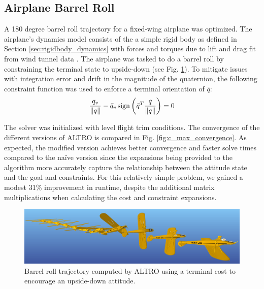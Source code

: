 \documentclass[letterpaper, 10 pt, conference]{ieeeconf}  %
\DeclareMathOperator{\sign}{sign}
\newcommand{\todo}[1]{\textcolor{red}{TODO: #1}}
\begin{document}
    \subsection{Airplane Barrel Roll}

        A 180 degree barrel roll trajectory for a fixed-wing airplane was
        optimized. The airplane's dynamics model consists of the a simple
        rigid body as defined in Section \ref{sec:rigidbody_dynamics} with
        forces and torques due to lift and drag fit from wind tunnel data
        \cite{manchester2016udp}. The airplane was tasked to do a barrel roll
        by constraining the terminal state to upside-down (see Fig.
        \ref{fig:barrellroll}). To mitigate issues with integration error and
        drift in the magnitude of the quaternion, the following constraint
        function was used to enforce a terminal orientation of $\bar{q}$:
        \begin{equation}
            \frac{q_v}{\norm{q}} - \bar{q}_v
                \sign\left(\bar{q}^T \frac{q }{ \norm{q}}\right) = 0
        \end{equation}

        The solver was initialized with level flight trim
        conditions. The convergence of the different versions of ALTRO is compared in
        Fig. \ref{fig:c_max_convergence}. As expected, the modified version achieves
        better convergence and faster solve times compared to the na\"ive version since
        the expansions being provided to the algorithm more accurately capture the
        relationship between the attitude state and the goal and constraints. For this 
        relatively simple problem, we gained a modest 31\% improvement in runtime, despite
        the additional matrix multiplications when calculating the cost and constraint
        expansions.

        \begin{figure}[t]
            \centering
            \includegraphics[width=\columnwidth]{figures/barrellroll.png}
            \caption{Barrel roll trajectory computed by ALTRO using a terminal cost to encourage an upside-down attitude.}
            \label{fig:barrellroll}
        \end{figure}
\end{document}
